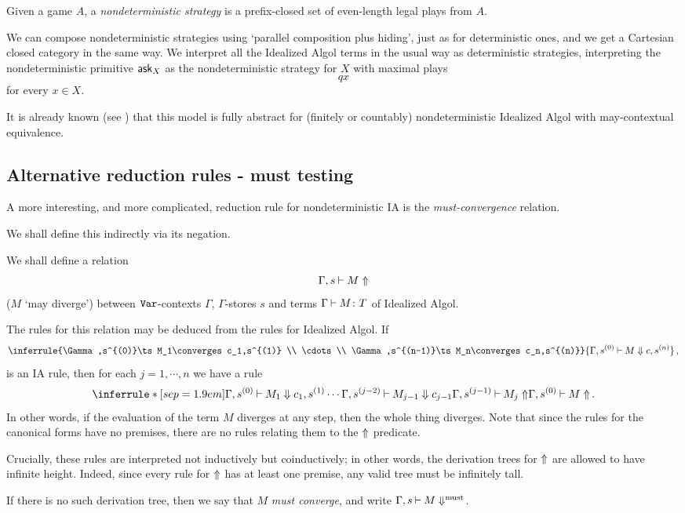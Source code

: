 \documentclass{article}
\begin{document}
\begin{definition}
  Given a game $A$, a \emph{nondeterministic strategy} is a prefix-closed set of even-length legal plays from $A$.
\end{definition}

We can compose nondeterministic strategies using `parallel composition plus hiding', just as for deterministic ones, and we get a Cartesian closed category in the same way.  
We interpret all the Idealized Algol terms in the usual way as deterministic strategies, interpreting the nondeterministic primitive $\operatorname{{\mathsf{ask}}}_X$ as the nondeterministic strategy for $X$ with maximal plays
\[
  qx
  \]
for every $x\in X$.

It is already known (see \cite{mcCHFiniteND}) that this model is fully abstract for (finitely or countably) nondeterministic Idealized Algol with may-contextual equivalence.

\subsection{Alternative reduction rules - must testing}

A more interesting, and more complicated, reduction rule for nondeterministic IA is the \emph{must-convergence} relation.

We shall define this indirectly via its negation.

\begin{definition}
  We shall define a relation
  \[
    \Gamma,s\mathbin{\vdash} M\Uparrow
    \]
  ($M$ `may diverge') between ${\mathtt{Var}}$-contexts $\Gamma$, $\Gamma$-stores $s$ and terms $\Gamma\mathbin{\vdash} M\colon T$ of Idealized Algol.

  The rules for this relation may be deduced from the rules for Idealized Algol.  
  If
  \[
    \inferrule{\Gamma,s^{(0)}\ts M_1\converges c_1,s^{(1)} \\ \cdots \\ \Gamma,s^{(n-1)}\ts M_n\converges c_n,s^{(n)}}
    {\Gamma,s^{(0)} \ts M \converges c,s^{(n)}}\,,
    \]
  is an IA rule, then for each $j=1,\cdots,n$ we have a rule
  \[
    \inferrule*[sep=1.9em]{\Gamma,s^{(0)}\ts M_1 \converges c_1,s^{(1)} \\ \cdots \\ \Gamma,s^{(j-2)} \ts M_{j-1} \converges c_{j-1} \\ \Gamma,s^{(j-1)}\ts M_j\diverges}
    {\Gamma,s^{(0)} \ts M \diverges}\,.
    \]
  In other words, if the evaluation of the term $M$ diverges at any step, then the whole thing diverges.  
  Note that since the rules for the canonical forms have no premises, there are no rules relating them to the $\Uparrow$ predicate.

  Crucially, these rules are interpreted not inductively but coinductively; in other words, the derivation trees for $\Uparrow$ are allowed to have infinite height.
  Indeed, since every rule for $\Uparrow$ has at least one premise, any valid tree must be infinitely tall.

  If there is no such derivation tree, then we say that $M$ \emph{must converge}, and write $\Gamma,s\mathbin{\vdash} M\Downarrow^{\text{must}}$.
  \label{DefMayDivergence}
\end{definition}
\end{document}
